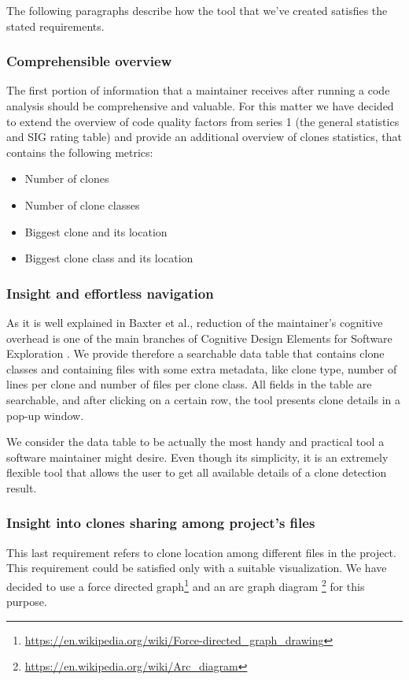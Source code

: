 \documentclass{uva-inf-article}
\begin{document}
The following paragraphs describe how the tool that we've created satisfies the stated requirements. 

\subsubsection{Comprehensible overview}
The first portion of information that a maintainer receives after running a code analysis should be comprehensive and valuable. For this matter we have decided to extend the overview of code quality factors from series 1 (the general statistics and SIG rating table) and provide an additional overview of clones statistics, that contains the following metrics: 
\begin{itemize}
	\item{Number of clones}
	\item{Number of clone classes}
	\item{Biggest clone and its location}
	\item{Biggest clone class and its location}
\end{itemize}

\subsubsection{Insight and effortless navigation}
As it is well explained in Baxter et al., reduction of the maintainer's cognitive overhead is one of the main branches of Cognitive Design Elements for Software Exploration \cite{baxter1998clone}. We provide therefore a searchable data table that contains clone classes and containing files with some extra metadata, like clone type, number of lines per clone and number of files per clone class. All fields in the table are searchable, and after clicking on a certain row, the tool presents clone details in a pop-up window. 

We consider the data table to be actually the most handy and practical tool a software maintainer might desire. Even though its simplicity, it is an extremely flexible tool that allows the user to get all available details of a clone detection result.

\subsubsection{Insight into clones sharing among project's files}
This last requirement refers to clone location among different files in the project. This requirement could be satisfied only with a suitable visualization. We have decided to use a force directed graph\footnote{\url{https://en.wikipedia.org/wiki/Force-directed_graph_drawing}} and an arc graph diagram \footnote{\url{https://en.wikipedia.org/wiki/Arc_diagram}} for this purpose. 
\end{document}

